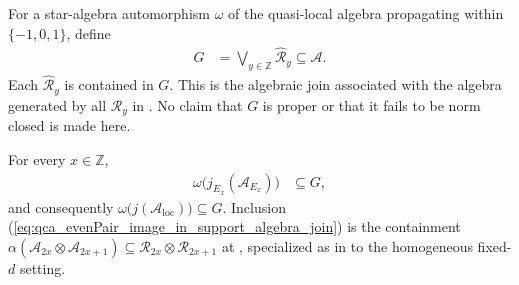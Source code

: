 \begin{definition}
    \label{def:qca_support_algebra_join}
    \leanok
    For a star-algebra automorphism $\omega$ of the quasi-local algebra
    propagating within $\{-1,0,1\}$, define
    \begin{align}
        G & =\bigvee_{y\in\mathbb Z}\widehat{\mathcal R}_y
        \subseteq\mathcal A.
        \label{eq:qca_support_algebra_join}
    \end{align}
    Each $\widehat{\mathcal R}_y$ is contained in $G$.  This is the algebraic
    join associated with the algebra generated by all $\mathcal R_y$ in
    \cite[lines~1276--1279]{Gross2012IndexTheory}.  No claim that $G$ is
    proper or that it fails to be norm closed is made here.
\end{definition}

\begin{lemma}
    \label{thm:qca_evenPair_image_in_support_algebra_join}
    \leanok
    For every $x\in\mathbb Z$,
    \begin{align}
        \omega\bigl(j_{E_x}(\mathcal A_{E_x})\bigr) & \subseteq G,
        \label{eq:qca_evenPair_image_in_support_algebra_join}
    \end{align}
    and consequently
    $\omega\bigl(j(\mathcal A_{\mathrm{loc}})\bigr)\subseteq G$.
    Inclusion (\ref{eq:qca_evenPair_image_in_support_algebra_join}) is the
    containment
    $\alpha(\mathcal A_{2x}\otimes\mathcal A_{2x+1})\subseteq
        \mathcal R_{2x}\otimes\mathcal R_{2x+1}$
    at \cite[lines~1276--1278]{Gross2012IndexTheory}, specialized as in \cite{gap:gnvw12_site_dependent_adjacent_generation_scope} to the homogeneous
    fixed-$d$
    setting.
\end{lemma}

